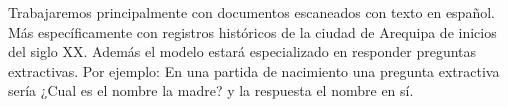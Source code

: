 \documentclass[../main.tex]{subfiles}
\begin{document}
%
%


Trabajaremos principalmente con documentos escaneados con texto en español.
Más específicamente con registros históricos de la ciudad de Arequipa de inicios del siglo XX.
Además el modelo estará especializado en responder preguntas extractivas.
Por ejemplo: En una partida de nacimiento una pregunta extractiva sería ¿Cual es el nombre la madre?
y la respuesta el nombre en sí.


\end{document}
